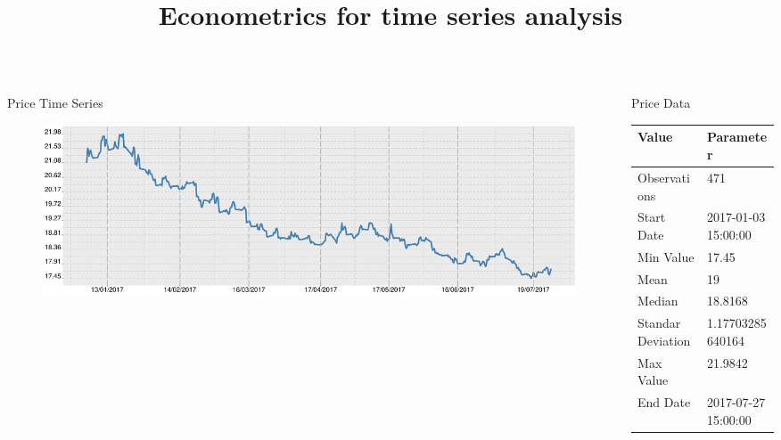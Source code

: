 \documentclass[final, xcolor=table]{beamer}\usepackage[]{graphicx}\usepackage[]{color}
\title{\Huge Econometrics for time series analysis }
\begin{document}

\begin{columns}[t]


\begin{column}{.66 \linewidth}

  \begin{block}{Price Time Series}

  \begin{figure}[H]
    \includegraphics[scale=1]{figure/Plot_ts-1.pdf}
  \end{figure}

  \end{block}
  
\end{column}


\begin{column}{.32 \linewidth}
  
  \begin{block}{Price Data}
  
  \centering
  
\begin{tabular}{l|l}
\hline
Value & Parameter\\
\hline
Observations & 471\\
\hline
Start Date & 2017-01-03 15:00:00\\
\hline
Min Value & 17.45\\
\hline
Mean & 19\\
\hline
Median & 18.8168\\
\hline
Standar Deviation & 1.17703285640164\\
\hline
Max Value & 21.9842\\
\hline
End Date & 2017-07-27 15:00:00\\
\hline
\end{tabular}



\end{block}
\end{column}
\end{columns}
\end{document}
